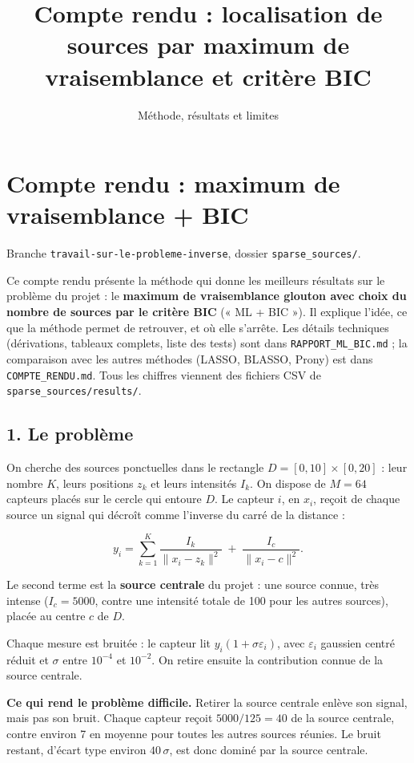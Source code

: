 \documentclass[
  french,
]{article}
\title{Compte rendu : localisation de sources par maximum de
vraisemblance et critère BIC}
\subtitle{Méthode, résultats et limites}
\author{}
\date{}
\begin{document}
\maketitle

\section{Compte rendu : maximum de vraisemblance +
BIC}\label{compte-rendu-maximum-de-vraisemblance-bic}

Branche \texttt{travail-sur-le-probleme-inverse}, dossier
\texttt{sparse\_sources/}.

Ce compte rendu présente la méthode qui donne les meilleurs résultats
sur le problème du projet : le \textbf{maximum de vraisemblance glouton
avec choix du nombre de sources par le critère BIC} (« ML + BIC »). Il
explique l'idée, ce que la méthode permet de retrouver, et où elle
s'arrête. Les détails techniques (dérivations, tableaux complets, liste
des tests) sont dans \texttt{RAPPORT\_ML\_BIC.md} ; la comparaison avec
les autres méthodes (LASSO, BLASSO, Prony) est dans
\texttt{COMPTE\_RENDU.md}. Tous les chiffres viennent des fichiers CSV
de \texttt{sparse\_sources/results/}.

\subsection{1. Le problème}\label{le-probluxe8me}

On cherche des sources ponctuelles dans le rectangle
\(D = [0,10]\times[0,20]\) : leur nombre \(K\), leurs positions \(z_k\)
et leurs intensités \(I_k\). On dispose de \(M = 64\) capteurs placés
sur le cercle qui entoure \(D\). Le capteur \(i\), en \(x_i\), reçoit de
chaque source un signal qui décroît comme l'inverse du carré de la
distance :

\[
y_i = \sum_{k=1}^{K} \frac{I_k}{\lVert x_i - z_k\rVert^2} \;+\; \frac{I_c}{\lVert x_i - c\rVert^2} .
\]

Le second terme est la \textbf{source centrale} du projet : une source
connue, très intense (\(I_c = 5000\), contre une intensité totale de 100
pour les autres sources), placée au centre \(c\) de \(D\).

Chaque mesure est bruitée : le capteur lit
\(y_i(1 + \sigma\varepsilon_i)\), avec \(\varepsilon_i\) gaussien centré
réduit et \(\sigma\) entre \(10^{-4}\) et \(10^{-2}\). On retire ensuite
la contribution connue de la source centrale.

\textbf{Ce qui rend le problème difficile.} Retirer la source centrale
enlève son signal, mais pas son bruit. Chaque capteur reçoit
\(5000/125 = 40\) de la source centrale, contre environ 7 en moyenne
pour toutes les autres sources réunies. Le bruit restant, d'écart type
environ \(40\,\sigma\), est donc dominé par la source centrale.
\end{document}
